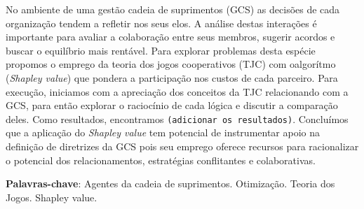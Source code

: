 \documentclass[
	article,			        %
	11pt,				          %
	oneside,			        %
	a4paper,			        %
	english,			        %
	brazil,				        %
	sumario=tradicional
]{abntex2}\usepackage[]{graphicx}\usepackage[]{color}
\author{João B. G. Brito, \emph{Esp.}   \\   
    \href{mailto:jbgb@uol.com.br}{jbgb@uol.com.br} 
  \and {Michel J. Anzanello, \emph{Phd}} \\
    \href{mailto:michel.anzanello@gmail.com}{michel.anzanello@gmail.com}
}
\date{\today}
\begin{document}

\frenchspacing 


%
%
\maketitle

\begin{resumoumacoluna}
No ambiente de uma gestão cadeia de suprimentos (GCS) as decisões de cada organização tendem a refletir nos seus elos. A análise destas interações é importante para avaliar a colaboração entre seus membros, sugerir acordos e buscar o equilíbrio mais rentável. Para explorar problemas desta espécie propomos o emprego da teoria dos jogos cooperativos (TJC) com oalgorítmo (\emph{Shapley value}) que pondera a participação nos custos de cada parceiro. Para execução, iniciamos com a apreciação dos conceitos da TJC relacionando com a GCS, para então explorar o raciocínio de cada lógica e discutir a comparação deles. Como resultados, encontramos \texttt{(adicionar os resultados)}. Concluímos que a aplicação do \emph{Shapley value} tem potencial de instrumentar apoio na definição de diretrizes da GCS pois seu emprego oferece recursos para racionalizar o potencial dos relacionamentos, estratégias conflitantes e colaborativas.

 \vspace{\onelineskip}
 
 \noindent
 \textbf{Palavras-chave}: Agentes da cadeia de suprimentos. Otimizaç{ã}o. Teoria dos Jogos. Shapley value.
\end{resumoumacoluna}


\textual

\end{document}
